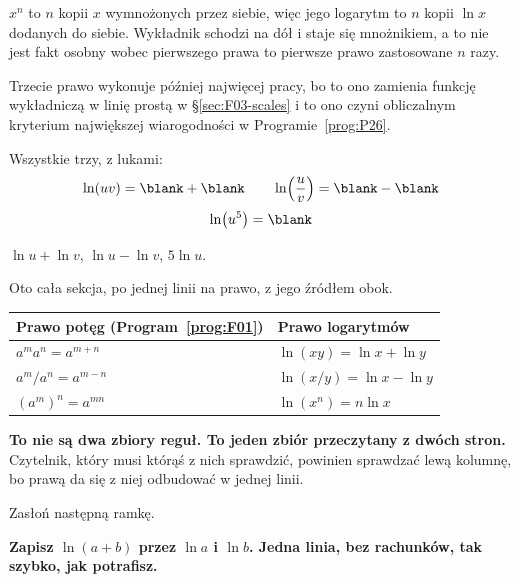 \begin{fr}
$x^{n}$ to $n$ kopii $x$ wymnożonych przez siebie, więc jego logarytm to $n$
kopii $\ln x$ dodanych do siebie. Wykładnik schodzi na dół i staje się
mnożnikiem, a to nie jest fakt osobny wobec pierwszego prawa \dash{} to
pierwsze prawo zastosowane $n$ razy.

Trzecie prawo wykonuje później najwięcej pracy, bo to ono zamienia funkcję
wykładniczą w linię prostą w \S\ref{sec:F03-scales} i to ono czyni obliczalnym
kryterium największej wiarogodności w Programie~\ref{prog:P26}.

Wszystkie trzy, z lukami:
\[ \ln(uv) = \blank + \blank \qquad
   \ln\!\left(\frac{u}{v}\right) = \blank - \blank \]
\[ \ln\!\left(u^{5}\right) = \blank \]
\dotline
\nextframe
\end{fr}

\begin{fr}
\begin{ansblock}
$\ln u + \ln v$, \quad $\ln u - \ln v$, \quad $5 \ln u$.
\end{ansblock}

Oto cała sekcja, po jednej linii na prawo, z jego źródłem obok.

\begin{center}
\begin{tabular}{ll}
\toprule
Prawo potęg (Program~\ref{prog:F01}) & Prawo logarytmów \\
\midrule
$a^{m} a^{n} = a^{m+n}$ & $\ln(xy) = \ln x + \ln y$ \\
$a^{m} / a^{n} = a^{m-n}$ & $\ln(x/y) = \ln x - \ln y$ \\
$\left(a^{m}\right)^{n} = a^{mn}$ & $\ln\!\left(x^{n}\right) = n \ln x$ \\
\bottomrule
\end{tabular}
\end{center}

\textbf{To nie są dwa zbiory reguł. To jeden zbiór przeczytany z dwóch stron.}
Czytelnik, który musi którąś z nich sprawdzić, powinien sprawdzać lewą kolumnę,
bo prawą da się z niej odbudować w jednej linii.
\end{fr}

\begin{fr}
Zasłoń następną ramkę.

\textbf{Zapisz $\ln(a + b)$ przez $\ln a$ i $\ln b$. Jedna linia, bez
rachunków, tak szybko, jak potrafisz.}
\dotline
\nextframe
\end{fr}

